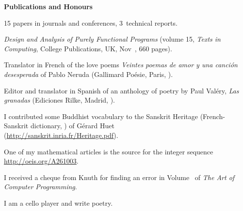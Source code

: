 \documentclass[a4paper,11pt]{article}
\begin{document}
\bigskip
\noindent\textbf{\large Publications and Honours}
\bigskip
\begin{itemize*}

  \item 15 papers in journals and conferences, 3~technical reports.

  \item \textit{Design and Analysis of Purely Functional Programs}
    (volume 15, \emph{Texts in Computing}, College Publications, UK,
    Nov~, 660 pages).

  \item Translator in French of the love poems \textit{Veintes poemas
    de amor y una canci\'on desesperada} of Pablo Neruda (Gallimard
    Po\'esie, Paris, ).

  \item Editor and translator in Spanish of an anthology of poetry by
    Paul Val\'ery, \emph{Las granadas} (Ediciones Rilke, Madrid,
    ).

  \item I contributed some Buddhist vocabulary to the Sanskrit
    Heritage (French-Sanskrit dictionary, ) of
    G\'{e}rard Huet\\ (\url{http://sanskrit.inria.fr/Heritage.pdf}).

  \item One of my mathematical articles is the source for the integer
    sequence \url{http://oeis.org/A261003}.

  \item I received a cheque from Knuth for finding an error in
    Volume~ of \emph{The Art of Computer Programming}.

  \item I am a cello player and write poetry.

\end{itemize*}



\nocite{*}
\end{document}
